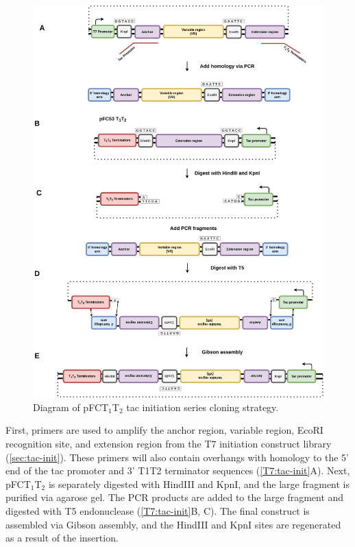 \documentclass[11pt]{article}
\begin{document}
\begin{figure}[H]
	\includegraphics[width=15cm]{images/cloning_diagrams/construct_diagrams-Tac-initiation-series.png}
	\centering
	\caption{Diagram of pFCT$_1$T$_2$ tac initiation series cloning strategy.}
\end{figure}

First,  primers are used to amplify the anchor region, variable region, EcoRI recognition site, and extension region from the T7 initiation construct library (\ref{sec:tac-init}). These primers will also contain overhangs with homology to the 5' end of the tac promoter and 3' T1T2 terminator sequences (\ref{T7:tac-init}A). Next, pFCT$_1$T$_2$ is separately digested with HindIII and KpnI, and the large fragment is purified via agarose gel. The PCR products are added to the large fragment and digested with T5 endonuclease (\ref{T7:tac-init}B, C). The final construct is assembled via Gibson assembly, and the HindIII and KpnI sites are regenerated as a result of the insertion. 
\end{document}
